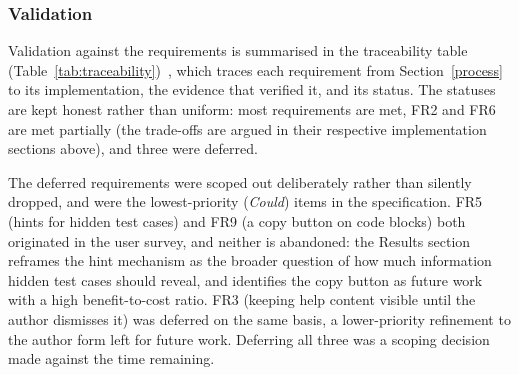 \subsubsection{Validation}
Validation against the requirements is summarised in the traceability table (Table~\ref{tab:traceability})~\cite{goteltraceability}, which traces each requirement from Section~\ref{process} to its implementation, the evidence that verified it, and its status. The statuses are kept honest rather than uniform: most requirements are met, FR2 and FR6 are met partially (the trade-offs are argued in their respective implementation sections above), and three were deferred.

The deferred requirements were scoped out deliberately rather than silently dropped, and were the lowest-priority (\emph{Could}) items in the specification. FR5 (hints for hidden test cases) and FR9 (a copy button on code blocks) both originated in the user survey, and neither is abandoned: the Results section reframes the hint mechanism as the broader question of how much information hidden test cases should reveal, and identifies the copy button as future work with a high benefit-to-cost ratio. FR3 (keeping help content visible until the author dismisses it) was deferred on the same basis, a lower-priority refinement to the author form left for future work. Deferring all three was a scoping decision made against the time remaining.

